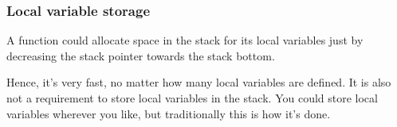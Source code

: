 \subsubsection{Local variable storage}

A function could allocate space in the stack for its local variables just by decreasing 
the \gls{stack pointer} towards the stack bottom.


Hence, it's very fast, no matter how many local variables are defined.
It is also not a requirement to store local variables in the stack.
You could store local variables wherever you like, 
but traditionally this is how it's done.

